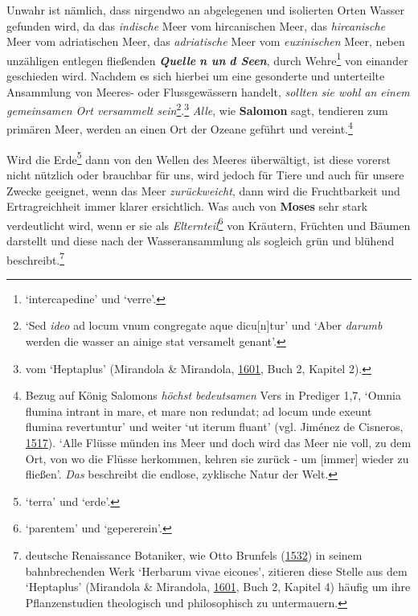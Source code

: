 \documentclass[
]{article}
\begin{document}
Unwahr ist nämlich, dass nirgendwo an abgelegenen und isolierten Orten
Wasser gefunden wird, da das \emph{indische} Meer vom hircanischen Meer,
das \emph{hircanische} Meer vom adriatischen Meer, das
\emph{adriatische} Meer vom \emph{euxinischen} Meer, neben unzähligen
entlegen fließenden \textbf{\emph{Quelle}} \textbf{\emph{n un}}
\textbf{\emph{d Seen}}, durch Wehre\footnote{`intercapedine' und
  `verre'.} von einander geschieden wird. Nachdem es sich hierbei um
eine gesonderte und unterteilte Ansammlung von Meeres- oder
Flussgewässern handelt, \emph{sollten sie wohl an einem gemeinsamen Ort
versammelt sein}\footnote{`Sed \emph{ideo} ad locum vnum congregate aque
  dicu{[}n{]}tur' und `Aber \emph{darumb} werden die wasser an ainige
  stat versamelt genant'.}.\footnote{vom `Heptaplus' (Mirandola \&
  Mirandola, \href{https://doi.org/10.3931/e-rara-61217}{1601}, Buch 2,
  Kapitel 2).} \emph{Alle}, wie \textbf{Salomon} sagt, tendieren zum
primären Meer, werden an einen Ort der Ozeane geführt und
vereint.\footnote{Bezug auf König Salomons \emph{höchst bedeutsamen}
  Vers in Prediger 1,7, `Omnia flumina intrant in mare, et mare non
  redundat; ad locum unde exeunt flumina revertuntur' und weiter `ut
  iterum fluant' (vgl. Jiménez de Cisneros,
  \href{https://doi.org/10.3931/e-rara-46695}{1517}). `Alle Flüsse
  münden ins Meer und doch wird das Meer nie voll, zu dem Ort, von wo
  die Flüsse herkommen, kehren sie zurück - um {[}immer{]} wieder zu
  fließen'. \emph{Das} beschreibt die endlose, zyklische Natur der Welt.}

Wird die Erde\footnote{`terra' und `erde'.} dann von den Wellen des
Meeres überwältigt, ist diese vorerst nicht nützlich oder brauchbar für
uns, wird jedoch für Tiere und auch für unsere Zwecke geeignet, wenn das
Meer \emph{zurückweicht}, dann wird die Fruchtbarkeit und
Ertragreichheit immer klarer ersichtlich. Was auch von \textbf{Moses}
sehr stark verdeutlicht wird, wenn er sie als
\emph{Elternteil}\footnote{`parentem' und `gepererein'.} von Kräutern,
Früchten und Bäumen darstellt und diese nach der Wasseransammlung als
sogleich grün und blühend beschreibt.\footnote{deutsche Renaissance
  Botaniker, wie Otto Brunfels
  (\href{https://www.digitale-sammlungen.de/de/view/bsb11200240?page=1}{1532})
  in seinem bahnbrechenden Werk `Herbarum vivae eicones', zitieren diese
  Stelle aus dem `Heptaplus' (Mirandola \& Mirandola,
  \href{https://doi.org/10.3931/e-rara-61217}{1601}, Buch 2, Kapitel 4)
  häufig um ihre Pflanzenstudien theologisch und philosophisch zu
  untermauern.}
\end{document}
